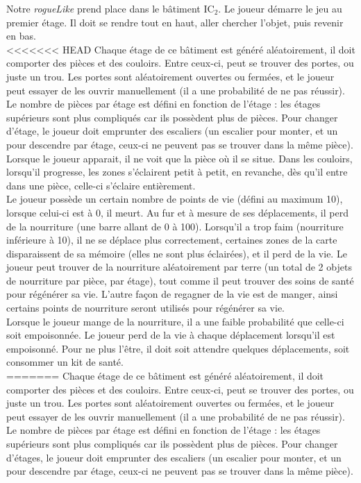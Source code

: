 \documentclass[11pt]{report}
\begin{document}
	Notre \emph{rogueLike} prend place dans le bâtiment IC$_2$. Le joueur démarre le jeu au premier étage. Il doit se rendre tout en haut, aller chercher l'objet, puis revenir en bas.\\
<<<<<<< HEAD
	Chaque étage de ce bâtiment est généré aléatoirement, il doit comporter des pièces et des couloirs. Entre ceux-ci, peut se trouver des portes, ou juste un trou. Les portes sont aléatoirement ouvertes ou fermées, et le joueur peut essayer de les ouvrir manuellement (il a une probabilité de ne pas réussir). Le nombre de pièces par étage est défini en fonction de l'étage : les étages supérieurs sont plus compliqués car ils possèdent plus de pièces. Pour changer d'étage, le joueur doit emprunter des escaliers (un escalier pour monter, et un pour descendre par étage, ceux-ci ne peuvent pas se trouver dans la même pièce).\\
	Lorsque le joueur apparait, il ne voit que la pièce où il se situe. Dans les couloirs, lorsqu'il progresse, les zones s'éclairent petit à petit, en revanche, dès qu'il entre dans une pièce, celle-ci s'éclaire entièrement.\\
	Le joueur possède un certain nombre de points de vie (défini au maximum 10), lorsque celui-ci est à 0, il meurt. Au fur et à mesure de ses déplacements, il perd de la nourriture (une barre allant de 0 à 100). Lorsqu'il a trop faim (nourriture inférieure à 10), il ne se déplace plus correctement, certaines zones de la carte disparaissent de sa mémoire (elles ne sont plus éclairées), et il perd de la vie. Le joueur peut trouver de la nourriture aléatoirement par terre (un total de 2 objets de nourriture par pièce, par étage), tout comme il peut trouver des soins de santé pour régénérer sa vie. L'autre façon de regagner de la vie est de manger, ainsi certains points de nourriture seront utilisés pour régénérer sa vie.\\
	Lorsque le joueur mange de la nourriture, il a une faible probabilité que celle-ci soit empoisonnée. Le joueur perd de la vie à chaque déplacement lorsqu'il est empoisonné. Pour ne plus l'être, il doit soit attendre quelques déplacements, soit consommer un kit de santé.\\
=======
	Chaque étage de ce bâtiment est généré aléatoirement, il doit comporter des pièces et des couloirs. Entre ceux-ci, peut se trouver des portes, ou juste un trou. Les portes sont aléatoirement ouvertes ou fermées, et le joueur peut essayer de les ouvrir manuellement (il a une probabilité de ne pas réussir). Le nombre de pièces par étage est défini en fonction de l'étage : les étages supérieurs sont plus compliqués car ils possèdent plus de pièces. Pour changer d'étages, le joueur doit emprunter des escaliers (un escalier pour monter, et un pour descendre par étage, ceux-ci ne peuvent pas se trouver dans la même pièce).\\
\end{document}
